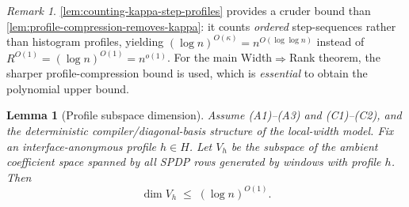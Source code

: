 \documentclass[12pt]{article}
\newtheorem{lemma}[theorem]{Lemma}
\theoremstyle{definition}
\theoremstyle{remark}
\newtheorem{remark}[theorem]{Remark}
\begin{document}
\begin{remark}
\ref{lem:counting-kappa-step-profiles} provides a cruder bound than
\ref{lem:profile-compression-removes-kappa}: it counts \emph{ordered} step-sequences rather
than histogram profiles, yielding $(\log n)^{O(\kappa)} = n^{O(\log\log n)}$ instead
of $R^{O(1)} = (\log n)^{O(1)} = n^{o(1)}$. For the main Width$\Rightarrow$Rank theorem, the sharper
profile-compression bound is used, which is \emph{essential} to obtain the
polynomial upper bound.
\end{remark}

\begin{lemma}[Profile subspace dimension]
\label{lem:profile-subspace-dim}
Assume (A1)--(A3) and (C1)--(C2), and the deterministic compiler\slash diagonal-basis
structure of the local-width model. Fix an interface-anonymous profile $h\in H$.
Let $V_h$ be the subspace of the ambient coefficient space spanned by all SPDP rows
generated by windows with profile $h$. Then
\[
\dim V_h \;\le\; (\log n)^{O(1)}.
\]
\end{lemma}
\end{document}
